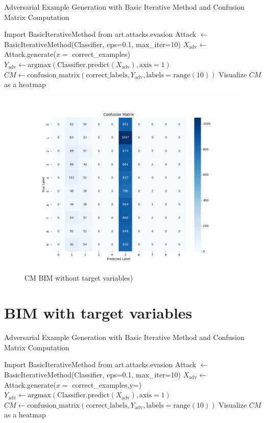 \documentclass[11pt,onside]{article}
\begin{document}
\begin{algorithm}[H]
\caption{Adversarial Example Generation with Basic Iterative Method and Confusion Matrix Computation}
\begin{algorithmic}[1]
\State Import BasicIterativeMethod from art.attacks.evasion
\State Attack $\gets$ BasicIterativeMethod(Classifier, eps=0.1, max\_iter=10)
\State $X_{\text{adv}} \gets$ Attack.generate($x=$ correct\_examples)
\State $Y_{\text{adv}} \gets \text{argmax}(\text{Classifier.predict}(X_{\text{adv}}), \text{axis}=1)$
\State $CM \gets \text{confusion\_matrix}(\text{correct\_labels}, Y_{\text{adv}}, \text{labels}=\text{range}(10))$
\State Visualize $CM$ as a heatmap
\end{algorithmic}
\end{algorithm}


\begin{figure}[h]
\centering
\includegraphics[width=1\textwidth]{V1_images/BIK_without_target.png}
\caption{CM BIM without target variables)}
\label{fig: BIM without target variables)}
\end{figure}


\section{BIM with target variables}

\begin{algorithm}[H]
\caption{Adversarial Example Generation with Basic Iterative Method and Confusion Matrix Computation}
\begin{algorithmic}[1]
\State Import BasicIterativeMethod from art.attacks.evasion
\State Attack $\gets$ BasicIterativeMethod(Classifier, eps=0.1, max\_iter=10)
\State $X_{\text{adv}} \gets$ Attack.generate($x=$ correct\_examples,y=)
\State $Y_{\text{adv}} \gets \text{argmax}(\text{Classifier.predict}(X_{\text{adv}}), \text{axis}=1)$
\State $CM \gets \text{confusion\_matrix}(\text{correct\_labels}, Y_{\text{adv}}, \text{labels}=\text{range}(10))$
\State Visualize $CM$ as a heatmap
\end{algorithmic}
\end{algorithm}
\end{document}
